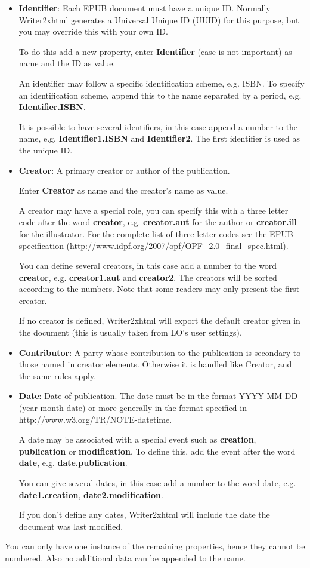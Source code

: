 \documentclass{article}
\newcommand\textstyleInternetlink[1]{#1}
\newcommand\liststyleLxv{%
\renewcommand\labelitemi{{\textbullet}}
\renewcommand\labelitemii{${\circ}$}
\renewcommand\labelitemiii{${\blacksquare}$}
\renewcommand\labelitemiv{{\textbullet}}
}
\begin{document}
\liststyleLxv
\begin{itemize}
\item \textbf{Identifier}: Each EPUB document must have a unique ID. Normally Writer2xhtml generates a Universal Unique ID (UUID) for this purpose, but you may override this with your own ID.

To do this add a new property, enter \textbf{Identifier} (case is not important) as name and the ID as value.

An identifier may follow a specific identification scheme, e.g. ISBN. To specify an identification scheme, append this to the name separated by a period, e.g. \textbf{Identifier.ISBN}.

It is possible to have several identifiers, in this case append a number to the name, e.g. \textbf{Identifier1.ISBN} and \textbf{Identifier2}. The first identifier is used as the unique ID.
\item \textbf{Creator}: A primary creator or author of the publication.

Enter \textbf{Creator} as name and the creator's name as value.

A creator may have a special role, you can specify this with a three letter code after the word \textbf{creator}, e.g. \textbf{creator.aut} for the author or \textbf{creator.ill} for the illustrator. For the complete list of three letter codes see the EPUB specification (\textstyleInternetlink{http://www.idpf.org/2007/opf/OPF\_2.0\_final\_spec.html}).

You can define several creators, in this case add a number to the word \textbf{creator}, e.g. \textbf{creator1.aut} and \textbf{creator2}. The creators will be sorted according to the numbers. Note that some readers may only present the first creator.

If no creator is defined, Writer2xhtml will export the default creator given in the document (this is usually taken from LO's user settings).
\item \textbf{Contributor}: A party whose contribution to the publication is secondary to those named in creator elements. Otherwise it is handled like Creator, and the same rules apply.
\item \textbf{Date}: Date of publication. The date must be in the format YYYY-MM-DD (year-month-date) or more generally in the format specified in \textstyleInternetlink{http://www.w3.org/TR/NOTE-datetime}.

A date may be associated with a special event such as \textbf{creation}, \textbf{publication} or \textbf{modification}. To define this, add the event after the word \textbf{date}, e.g. \textbf{date.publication}.

You can give several dates, in this case add a number to the word date, e.g. \textbf{date1.creation}, \textbf{date2.modification}.

If you don't define any dates, Writer2xhtml will include the date the document was last modified.
\end{itemize}
{\mdseries
You can only have one instance of the remaining properties, hence they cannot be numbered. Also no additional data can be appended to the name.}
\end{document}
